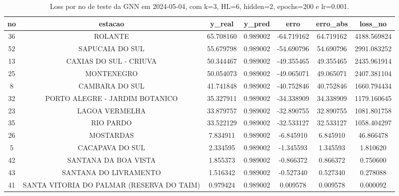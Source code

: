 \begin{table}[h]
\centering
\caption{Loss por no de teste da GNN em 2024-05-04, com k=3, HL=6, hidden=2, epochs=200 e lr=0.001.}
\label{tab:gnn_loss_k3_hl6_h2_e200_d20240504}
\begin{tabular}{ccccccc}
\toprule
no & estacao & y\_real & y\_pred & erro & erro\_abs & loss\_no \\
\midrule
36 & ROLANTE & 65.708160 & 0.989002 & -64.719162 & 64.719162 & 4188.569824 \\
52 & SAPUCAIA DO SUL & 55.679798 & 0.989002 & -54.690796 & 54.690796 & 2991.083252 \\
13 & CAXIAS DO SUL - CRIUVA & 50.344467 & 0.989002 & -49.355465 & 49.355465 & 2435.961914 \\
25 & MONTENEGRO & 50.054073 & 0.989002 & -49.065071 & 49.065071 & 2407.381104 \\
8 & CAMBARA DO SUL & 41.741848 & 0.989002 & -40.752846 & 40.752846 & 1660.794434 \\
32 & PORTO ALEGRE - JARDIM BOTANICO & 35.327911 & 0.989002 & -34.338909 & 34.338909 & 1179.160645 \\
23 & LAGOA VERMELHA & 33.879757 & 0.989002 & -32.890755 & 32.890755 & 1081.801758 \\
35 & RIO PARDO & 33.522129 & 0.989002 & -32.533127 & 32.533127 & 1058.404297 \\
26 & MOSTARDAS & 7.834911 & 0.989002 & -6.845910 & 6.845910 & 46.866478 \\
5 & CACAPAVA DO SUL & 2.334595 & 0.989002 & -1.345593 & 1.345593 & 1.810620 \\
42 & SANTANA DA BOA VISTA & 1.855373 & 0.989002 & -0.866372 & 0.866372 & 0.750600 \\
43 & SANTANA DO LIVRAMENTO & 1.516342 & 0.989002 & -0.527340 & 0.527340 & 0.278088 \\
41 & SANTA VITORIA DO PALMAR (RESERVA DO TAIM) & 0.979424 & 0.989002 & 0.009578 & 0.009578 & 0.000092 \\
\bottomrule
\end{tabular}
\end{table}
